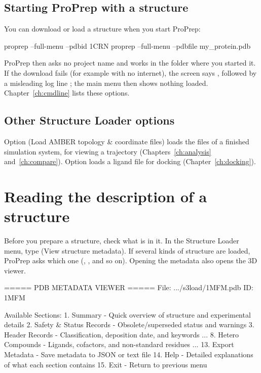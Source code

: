 \subsection{Starting ProPrep with a structure}

You can download or load a structure when you start ProPrep:
\begin{terminal}
proprep --full-menu --pdbid 1CRN
proprep --full-menu --pdbfile my_protein.pdb
\end{terminal}
ProPrep then asks no project name and works in the folder where you started it.
If the download fails (for example with no internet), the screen says
, followed by a misleading log line
; the main menu then shows nothing
loaded. Chapter~\ref{ch:cmdline} lists these options.

\subsection{Other Structure Loader options}

Option  (Load AMBER topology \& coordinate files) loads the files of a
finished simulation system, for viewing a trajectory
(Chapters~\ref{ch:analysis} and~\ref{ch:compare}). Option  loads a ligand
file for docking (Chapter~\ref{ch:docking}).

\section{Reading the description of a structure}
\label{sec:structure-metadata}

Before you prepare a structure, check what is in it. In the Structure Loader
menu, type  (View structure metadata). If several kinds of structure are
loaded, ProPrep asks which one (, , and so on). Opening the metadata also opens the 3D viewer.
\begin{screen}
===== PDB METADATA VIEWER =====
File: .../s3load/1MFM.pdb
ID: 1MFM

Available Sections:
 1. Summary                  - Quick overview of structure and experimental details
 2. Safety & Status Records  - Obsolete/superseded status and warnings
 3. Header Records           - Classification, deposition date, and keywords
...
 8. Hetero Compounds         - Ligands, cofactors, and non-standard residues
...
13. Export Metadata          - Save metadata to JSON or text file
14. Help                     - Detailed explanations of what each section contains
15. Exit                     - Return to previous menu
\end{screen}

